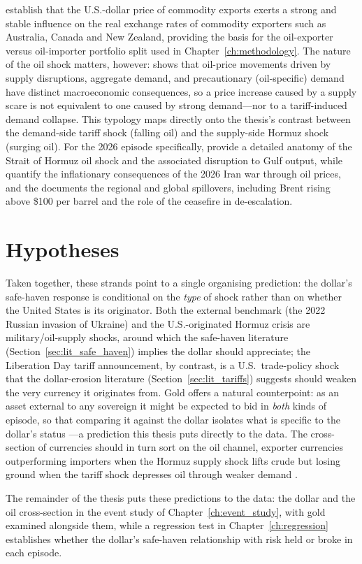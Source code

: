 \textcite{chen2003} establish that the U.S.-dollar price of commodity exports
exerts a strong and stable influence on the real exchange rates of commodity
exporters such as Australia, Canada and New Zealand, providing the basis for the
oil-exporter versus oil-importer portfolio split used in
Chapter~\ref{ch:methodology}. The nature of the oil shock matters, however:
\textcite{kilian2009} shows that oil-price movements driven by supply
disruptions, aggregate demand, and precautionary (oil-specific) demand have
distinct macroeconomic consequences, so a price increase caused by a supply scare
is not equivalent to one caused by strong demand---nor to a tariff-induced demand
collapse. This typology maps directly onto the thesis's contrast between the
demand-side tariff shock (falling oil) and the supply-side Hormuz shock (surging
oil). For the 2026 episode specifically, \textcite{fattouh2026} provide a detailed
anatomy of the Strait of Hormuz oil shock and the associated disruption to Gulf
output, while \textcite{kilian2026} quantify the inflationary consequences of the
2026 Iran war through oil prices, and the \textcite{imf2026menap} documents the
regional and global spillovers, including Brent rising above \$100 per barrel and
the role of the ceasefire in de-escalation.


\section{Hypotheses}
\label{sec:hypotheses}

Taken together, these strands point to a single organising prediction: the dollar's
safe-haven response is conditional on the \emph{type} of shock rather than on whether the
United States is its originator. Both the external benchmark (the 2022 Russian invasion of
Ukraine) and the U.S.-originated Hormuz crisis are military/oil-supply shocks, around which
the safe-haven literature (Section~\ref{sec:lit_safe_haven}) implies the dollar should
appreciate; the Liberation Day tariff announcement, by contrast, is a U.S.\ trade-policy
shock that the dollar-erosion literature (Section~\ref{sec:lit_tariffs}) suggests should
weaken the very currency it originates from. Gold offers a natural counterpoint: as an asset
external to any sovereign it might be expected to bid in \emph{both} kinds of episode, so
that comparing it against the dollar isolates what is specific to the dollar's status
\parencite{baur2010}---a prediction this thesis puts directly to the data. The cross-section
of currencies should in turn sort on the oil channel, exporter currencies outperforming
importers when the Hormuz supply shock lifts crude but losing ground when the tariff shock
depresses oil through weaker demand \parencite{chen2003,kilian2009}.

\noindent The remainder of the thesis puts these predictions to the data: the dollar
and the oil cross-section in the event study of Chapter~\ref{ch:event_study}, with gold
examined alongside them, while a regression test in Chapter~\ref{ch:regression} establishes
whether the dollar's safe-haven relationship with risk held or broke in each episode.
